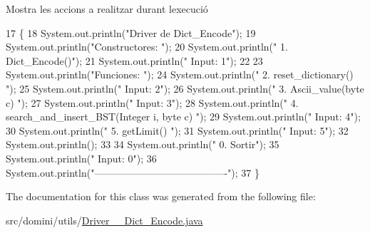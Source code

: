 Mostra les accions a realitzar durant l\textquotesingle{}execució 


\begin{DoxyCode}
17                                      \{
18         System.out.println(\textcolor{stringliteral}{"Driver de Dict\_Encode"});
19         System.out.println(\textcolor{stringliteral}{"Constructores: "});
20         System.out.println(\textcolor{stringliteral}{"     1. Dict\_Encode()"});
21         System.out.println(\textcolor{stringliteral}{"     Input: 1"});
22 
23         System.out.println(\textcolor{stringliteral}{"Funciones: "});
24         System.out.println(\textcolor{stringliteral}{"     2. reset\_dictionary() "});
25         System.out.println(\textcolor{stringliteral}{"     Input: 2"});
26         System.out.println(\textcolor{stringliteral}{"     3. Ascii\_value(byte c) "});
27         System.out.println(\textcolor{stringliteral}{"     Input: 3"});
28         System.out.println(\textcolor{stringliteral}{"     4. search\_and\_insert\_BST(Integer i, byte c) "});
29         System.out.println(\textcolor{stringliteral}{"     Input: 4"});
30         System.out.println(\textcolor{stringliteral}{"     5. getLimit() "});
31         System.out.println(\textcolor{stringliteral}{"     Input: 5"});
32         System.out.println();
33 
34         System.out.println(\textcolor{stringliteral}{"     0. Sortir"});
35         System.out.println(\textcolor{stringliteral}{"     Input: 0"});
36         System.out.println(\textcolor{stringliteral}{"----------------------------------------"});
37     \}
\end{DoxyCode}


The documentation for this class was generated from the following file\+:\begin{DoxyCompactItemize}
\item 
src/domini/utils/\hyperlink{Driver____Dict__Encode_8java}{Driver\+\_\+\+\_\+\+Dict\+\_\+\+Encode.\+java}\end{DoxyCompactItemize}
